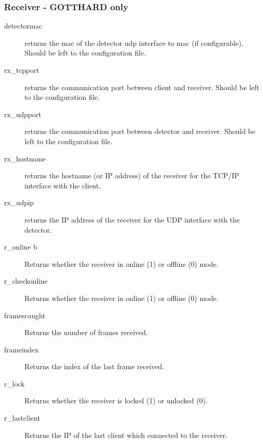 \documentclass{article}
\begin{document}
\subsubsection{Receiver -  GOTTHARD only}
\begin{description}



\item[detectormac] returns the mac of the detector udp interface to mac (if configurable). Should be left to the configuration file. 
\item[rx\_tcpport] returns the communication port between client and receiver. Should be left to the configuration file. 
\item[rx\_udpport] returns the communication port between detector and receiver. Should be left to the configuration file. 
\item[rx\_hostname] returns the hostname (or IP address) of the receiver for the TCP/IP interface with the client.
\item[rx\_udpip] returns the IP address of the receiver for the UDP interface with the detector.
  
\item[r\_online b] Returns whether the receiver in online (1) or offline (0) mode.           
\item[r\_checkonline]       Returns whether the receiver in online (1) or offline (0) mode.   
\item[framescaught]       Returns the number of frames received.      
\item[frameindex]     Returns the index of the last frame received.      
\item[r\_lock] Returns whether the receiver is locked (1) or unlocked (0).   
\item[r\_lastclient]    Returns the IP of the last client which connected to the receiver. 
\end{description} 
\end{document}
